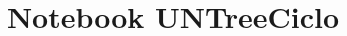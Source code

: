 \documentclass[8pt]{article}
\title{\vspace{-4ex}\Large{Notebook UNTreeCiclo}}
\author{}
\date{}
\begin{document}
\begin{landscape}
\setlength{\columnseprule}{0.4pt}
\setlength{\columnsep}{40pt}
\begin{multicols}{2}
\maketitle
\vspace{-13ex}
\tableofcontents
\pagestyle{fancy}



\end{multicols}
\setlength{\columnseprule}{0pt}
\begin{multicols}{2}

\end{multicols}

\pagebreak

\end{landscape}
\end{document}

